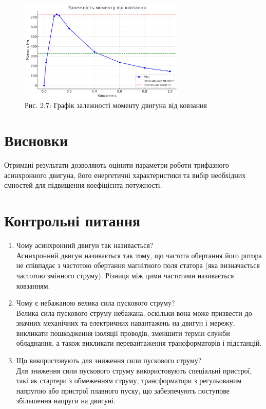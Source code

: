 \documentclass[a4paper]{article}
\begin{document}
\begin{figure}[h]
    \centering
    \includegraphics[width=0.7\textwidth]{imgs/LW2_moment_vs_slip.png}
    \caption*{Рис. 2.7: Графік залежності моменту двигуна від ковзання}
\end{figure}

\section*{Висновки}

Отримані результати дозволяють оцінити параметри роботи трифазного асинхронного двигуна, його енергетичні характеристики та вибір необхідних ємностей для підвищення коефіцієнта потужності.

\section*{Контрольні питання}
\begin{enumerate}
    \item Чому асинхронний двигун так називається? \\
    Асинхронний двигун називається так тому, що частота обертання його ротора не співпадає з частотою обертання магнітного поля статора (яка визначається частотою змінного струму). Різниця між цими частотами називається ковзанням.
    
    \item Чому є небажаною велика сила пускового струму? \\
    Велика сила пускового струму небажана, оскільки вона може призвести до значних механічних та електричних навантажень на двигун і мережу, викликати пошкодження ізоляції проводів, зменшити термін служби обладнання, а також викликати перевантаження трансформаторів і підстанцій.
    
    \item Що використовують для зниження сили пускового струму? \\
    Для зниження сили пускового струму використовують спеціальні пристрої, такі як стартери з обмеженням струму, трансформатори з регульованим напругою або пристрої плавного пуску, що забезпечують поступове збільшення напруги на двигуні.
\end{enumerate}
\end{document}
